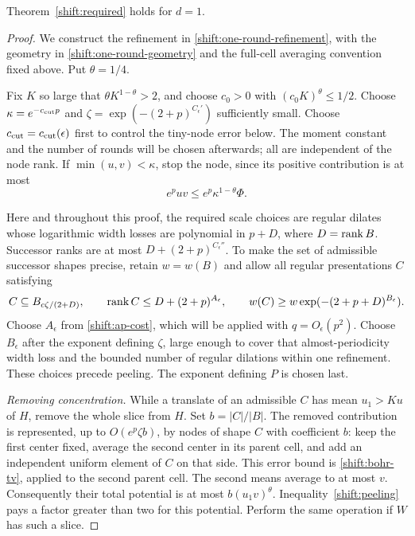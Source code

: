 \begin{proposition}\label{shift:degree-one}
Theorem~\ref{shift:required} holds for $d=1$.
\end{proposition}
\begin{proof}
We construct the refinement in \eqref{shift:one-round-refinement},
with the geometry in \eqref{shift:one-round-geometry} and the full-cell
averaging convention fixed above. Put $\theta=1/4$.

Fix $K$ so large that $\theta K^{1-\theta}>2$, and choose
$c_0>0$ with $(c_0K)^\theta\leq1/2$.  Choose
$\kappa=e^{-c_{\rm cut}p}$ and
$\zeta=\exp(-(2+p)^{C_\epsilon'})$ sufficiently small.
Choose $c_{\rm cut}=c_{\rm cut}(\epsilon)$ first to control the
tiny-node error below.  The moment constant and the number of rounds
will be chosen afterwards; all are independent of the node rank.
If $\min(u,v)<\kappa$, stop the node, since its positive
contribution is at most
\begin{equation}\label{shift:tiny-node}
 e^puv\leq e^p\kappa^{1-\theta}\Phi.
\end{equation}

Here and throughout this proof, the required scale choices are regular
dilates whose logarithmic width losses are polynomial in $p+D$, where
$D=\operatorname{rank} B$.  Successor ranks are at most
$D+(2+p)^{C_\epsilon''}$.  To make the set of admissible successor
shapes precise, retain $w=w(B)$ and allow all regular presentations $C$
satisfying
\[
 C\subseteq B_{c\zeta/(2+D)},\qquad
 \operatorname{rank} C\leq D+(2+p)^{A_\epsilon},\qquad
 w(C)\geq w\exp(-(2+p+D)^{B_\epsilon}).
\]
Choose $A_\epsilon$ from \eqref{shift:ap-cost}, which will be
applied with $q=O_\epsilon(p^2)$.  Choose $B_\epsilon$ after
the exponent defining $\zeta$, large enough to cover that
almost-periodicity width loss and the bounded number of regular
dilations within one refinement.  These choices
precede peeling.  The exponent defining $P$ is chosen last.

\emph{Removing concentration.}
While a translate of an admissible $C$ has mean $u_1>Ku$ of $H$,
remove the whole slice from $H$.  Set $b=|C|/|B|$.
The removed contribution is represented, up to
$O(e^p\zeta b)$, by nodes of shape $C$ with coefficient $b$:
keep the first center fixed, average the second center in its parent
cell, and add an independent uniform element of $C$ on that side.
This error bound is \eqref{shift:bohr-tv}, applied to the second
parent cell.  The second means average to at most $v$.
Consequently their total potential is at most $b(u_1v)^\theta$.
Inequality~\eqref{shift:peeling} pays a factor greater than two for
this potential.  Perform the same operation if $W$ has such a slice.


\end{proof}
